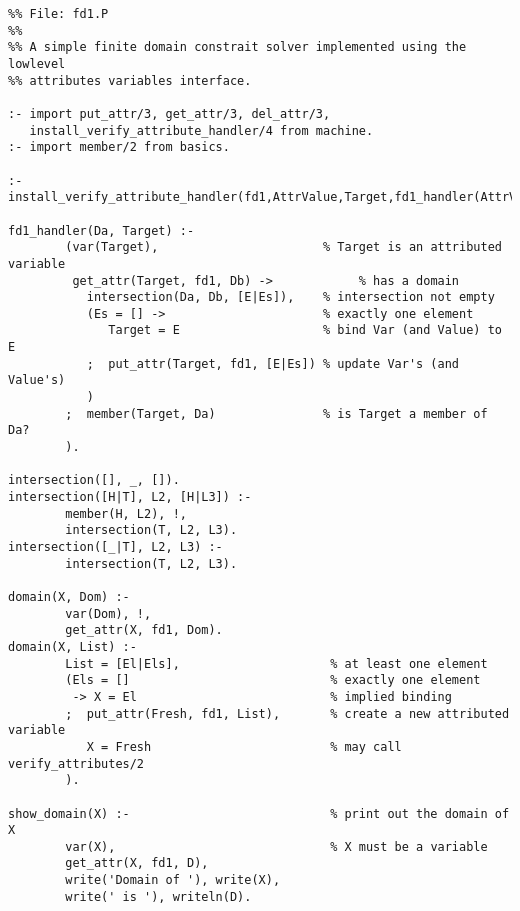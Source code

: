 \begin{small}
\begin{verbatim}
%% File: fd1.P
%%
%% A simple finite domain constrait solver implemented using the lowlevel 
%% attributes variables interface.  

:- import put_attr/3, get_attr/3, del_attr/3, 
   install_verify_attribute_handler/4 from machine.
:- import member/2 from basics.

:- install_verify_attribute_handler(fd1,AttrValue,Target,fd1_handler(AttrValue,Target)).

fd1_handler(Da, Target) :-
        (var(Target),                       % Target is an attributed variable
         get_attr(Target, fd1, Db) ->            % has a domain
           intersection(Da, Db, [E|Es]),    % intersection not empty
           (Es = [] ->                      % exactly one element
              Target = E                    % bind Var (and Value) to E
           ;  put_attr(Target, fd1, [E|Es]) % update Var's (and Value's)
           )
        ;  member(Target, Da)               % is Target a member of Da?
        ).

intersection([], _, []).
intersection([H|T], L2, [H|L3]) :-
        member(H, L2), !,
        intersection(T, L2, L3).
intersection([_|T], L2, L3) :-
        intersection(T, L2, L3).

domain(X, Dom) :- 
        var(Dom), !, 
        get_attr(X, fd1, Dom). 
domain(X, List) :- 
        List = [El|Els],                     % at least one element 
        (Els = []                            % exactly one element
         -> X = El                           % implied binding 
        ;  put_attr(Fresh, fd1, List),       % create a new attributed variable
           X = Fresh                         % may call verify_attributes/2
        ).

show_domain(X) :-                            % print out the domain of X
        var(X),                              % X must be a variable
        get_attr(X, fd1, D),
        write('Domain of '), write(X),
        write(' is '), writeln(D).

\end{verbatim}
\end{small}

